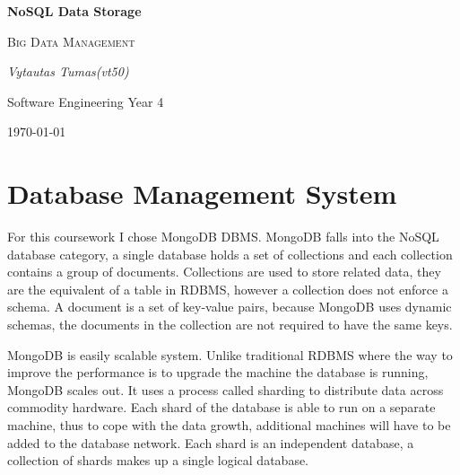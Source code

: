 \documentclass[a4paper, titlepage, 11pt]{article}
\begin{document}
 
\doublespacing

\author{Vytautas Tumas}
\begin{singlespace}
\begin{titlepage}
	\centering
	{\huge\bfseries NoSQL Data Storage\par}
	\vspace{1cm}
	{\scshape\LARGE Big Data Management\par}
		\vspace{1cm}

	\vspace{2cm}
	{\Large\itshape Vytautas Tumas(vt50)\par}
		{Software Engineering Year 4\par}
	\vfill

	{\large \today\par}
\end{titlepage}
\tableofcontents
\newpage
\end{singlespace}
\section{Database Management System}
For this coursework I chose MongoDB DBMS. MongoDB falls into the NoSQL database category, a single database holds a set of collections and each collection contains a group of documents. Collections are used to store related data, they are the equivalent of a table in RDBMS, however a collection does not enforce a schema. A document is a set of key-value pairs, because MongoDB uses dynamic schemas, the documents in the collection are not required to have the same keys.\par
MongoDB is easily scalable system. Unlike traditional RDBMS where the way to improve the performance is to upgrade the machine the database is running, MongoDB scales out. It uses a process called sharding to distribute data across commodity hardware. Each shard of the database is able to run on a separate machine, thus to cope with the data growth, additional machines will have to be added to the database network. Each shard is an independent database, a collection of shards makes up a single logical database. 
\end{document}
